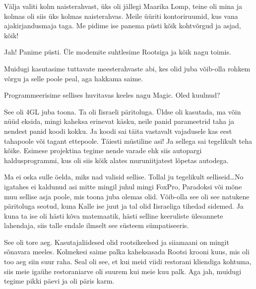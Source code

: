 Välja valiti kolm naisterahvast, üks oli jällegi Maarika Lomp, teine oli mina ja kolmas oli siis üks kolmas naisterahvas. Meile üüriti kontoriruumid, kus vana ajakirjandusmaja taga. Me pidime ise panema püsti kõik kohtvõrgud ja asjad, kõik! 


Jah! Panime püsti. Üle modemite suhtlesime Rootsiga ja kõik nagu toimis. 

Muidugi kasutasime tuttavate meesterahvaste abi, kes olid juba võib-olla rohkem  võrgu ja selle poole peal, aga hakkama saime. 

Programmeerisime sellises huvitavas keeles nagu Magic. Oled kuulnud? 


See oli 4GL juba toona. Ta oli Iisraeli päritoluga. Üldse oli kasutada,  ma võin nüüd eksida, mingi kaheksa erinevat käsku, neile panid parameetrid taha ja nendest panid koodi kokku. Ja koodi sai täita vastavalt vajadusele kas eest tahapoole või tagant ettepoole. Täiesti müstiline asi! Ja sellega sai tegelikult teha kõike. Esimese projektina tegime nende varade ehk siis autopargi haldusprogrammi, kus oli siis kõik alates muruniitjatest lõpetas autodega. 


Ma ei oska sulle öelda, miks nad valisid sellise. Tollal ju tegelikult selliseid\ldots No igatahes ei kaldunud asi mitte mingil juhul mingi FoxPro, Paradoksi või mõne muu sellise asja poole, mis toona juba olemas olid. Võib-olla see oli see natukene päritoluga seotud, kuna Kalle ise juut ja tal olid Iisraeliga tihedad sidemed. Ja kuna ta ise oli hästi kõva matemaatik, hästi selline keeruliste ülesannete lahendaja, siis talle endale ilmselt see süsteem sümpatiseeris. 

See oli tore aeg. Kasutajaliidesed olid rootsikeelsed ja siiamaani on mingit sõnavara meeles. Kolmekesi saime palka kaheksasada Rootsi krooni kuus, mis oli too aeg siin suur raha. Seal oli see, et kui meid viidi restorani kliendiga kohtuma, siis meie igaühe restoraniarve oli suurem kui meie kuu palk. Aga jah, muidugi tegime  pikki päevi ja oli päris karm. 

